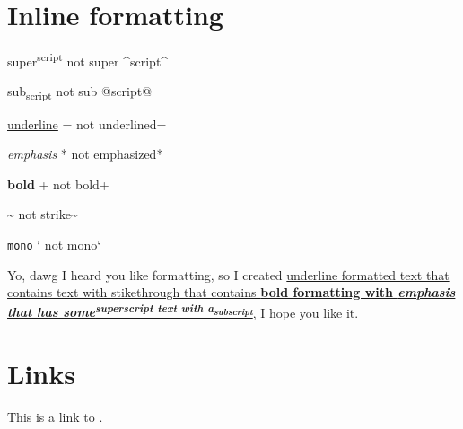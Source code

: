 \section{\label{inline-formatting}Inline formatting}
\par super\textsuperscript{script} not super {\textasciicircum}script{\textasciicircum}
\par sub\textsubscript{script} not sub @script@
\par \ul{underline}  = not underlined=
\par \emph{emphasis} * not emphasized*
\par \textbf{bold} + not bold+
\par {} {\textasciitilde} not strike{\textasciitilde}
\par \texttt{mono} ` not mono`
\par Yo, dawg I heard you like formatting, so I created \ul{underline formatted text that contains text with stikethrough that contains \textbf{bold formatting with \emph{emphasis that has some\textsuperscript{superscript text with a\textsubscript{subscript}}}}}, I hope you like it.
\section{\label{links}Links}
\par This is a link to . 